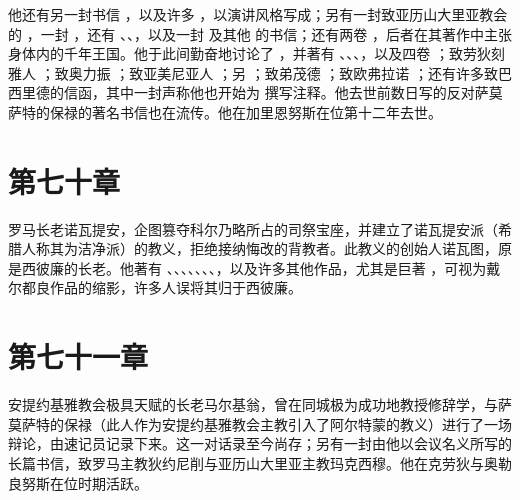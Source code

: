 他还有另一封书信 ，以及许多 ，以演讲风格写成；另有一封致亚历山大里亚教会的 ，一封 ，还有 、、，以及一封  及其他  的书信；还有两卷 ，后者在其著作中主张身体内的千年王国。他于此间勤奋地讨论了 ，并著有 、、、，以及四卷 ；致劳狄刻雅人 ；致奥力振 ；致亚美尼亚人 ；另 ；致弟茂德 ；致欧弗拉诺 ；还有许多致巴西里德的信函，其中一封声称他也开始为  撰写注释。他去世前数日写的反对萨莫萨特的保禄的著名书信也在流传。他在加里恩努斯在位第十二年去世。\par


\section{第七十章}

罗马长老诺瓦提安，企图篡夺科尔乃略所占的司祭宝座，并建立了诺瓦提安派（希腊人称其为洁净派）的教义，拒绝接纳悔改的背教者。此教义的创始人诺瓦图，原是西彼廉的长老。他著有 、、、、、、、，以及许多其他作品，尤其是巨著 ，可视为戴尔都良作品的缩影，许多人误将其归于西彼廉。\par


\section{第七十一章}

安提约基雅教会极具天赋的长老马尔基翁，曾在同城极为成功地教授修辞学，与萨莫萨特的保禄（此人作为安提约基雅教会主教引入了阿尔特蒙的教义）进行了一场辩论，由速记员记录下来。这一对话录至今尚存；另有一封由他以会议名义所写的长篇书信，致罗马主教狄约尼削与亚历山大里亚主教玛克西穆。他在克劳狄与奥勒良努斯在位时期活跃。\par

